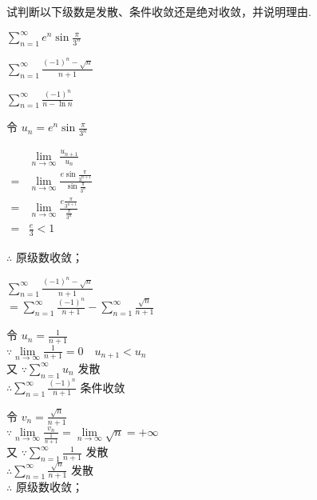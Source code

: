 \begin{problem}[points = 9]
试判断以下级数是发散、条件收敛还是绝对收敛，并说明理由.
\end{problem}
\begin{calculations}[columns = 3, label = (\arabic*)]
    \item $\sum\limits_{n = 1}^{\infty} e^n\sin{\frac{\pi}{3^n}}$
    \item $\sum\limits_{n = 1}^{\infty} \frac{(-1)^n - \sqrt{n}}{n + 1}$
    \item $\sum\limits_{n = 1}^{\infty} \frac{(-1)^n}{n - \ln{n}}$
\end{calculations}
\begin{solution}
    \begin{calculations}[columns = 3, label = (\arabic*)]
        \item 令 $u_n = e^n\sin{\frac{\pi}{3^n}}$

        $\begin{aligned}
                  & \lim\limits_{n \to \infty} \frac{u_{n + 1}}{u_n}                                  \\
                = & \lim\limits_{n \to \infty} \frac{e\sin{\frac{\pi}{3^{n + 1}}}}{\sin{\frac{\pi}{3^n}}} \\
                = & \lim\limits_{n \to \infty} \frac{e\frac{\pi}{3^{n + 1}}}{\frac{\pi}{3^n}}             \\
                = & \frac{e}{3} < 1
            \end{aligned}$

        $\therefore$ 原级数收敛；

        \item $\sum\limits_{n = 1}^{\infty} \frac{(-1)^n - \sqrt{n}}{n + 1}$ \\
        $ = \sum\limits_{n = 1}^{\infty} \frac{(-1)^n}{n + 1} - \sum\limits_{n = 1}^{\infty} \frac{\sqrt{n}}{n + 1}$

        令 $u_n = \frac{1}{n + 1}$ \\
        $\because \lim\limits_{n \to \infty} \frac{1}{n + 1} = 0 \quad u_{n + 1} < u_n$ \\
        又 $\because \sum\limits_{n =1}^{\infty} u_n$ 发散 \\
        $\therefore \sum\limits_{n = 1}^{\infty} \frac{(-1)^n}{n + 1}$ 条件收敛

        令 $v_n = \frac{\sqrt{n}}{n + 1}$ \\
        $\because \lim\limits_{n \to \infty} \frac{v_n}{\frac{1}{n + 1}} = \lim\limits_{n \to \infty} \sqrt{n} = +\infty$ \\
        又 $\because \sum\limits_{n = 1}^{\infty} \frac{1}{n + 1}$ 发散 \\
        $\therefore \sum\limits_{n = 1}^{\infty} \frac{\sqrt{n}}{n + 1}$ 发散 \\
        $\therefore$ 原级数收敛；


\end{calculations}
\end{solution}
